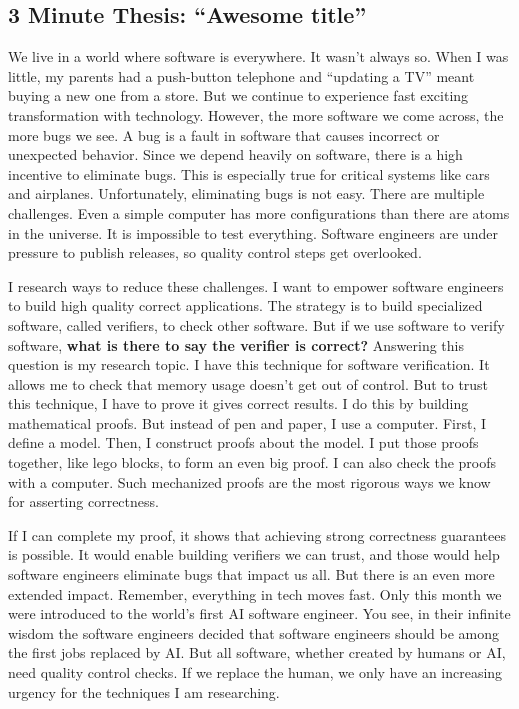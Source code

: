 \subsection{3 Minute Thesis: \enquote{Awesome title}}
\label{subsec:3mt}

We live in a world where software is everywhere.
It wasn’t always so.
When I was little, my parents had a push-button telephone and “updating a TV” meant buying a new one from a store.
But we continue to experience fast exciting transformation with technology.
However, the more software we come across, the more bugs we see.
A bug is a fault in software that causes incorrect or unexpected behavior.
Since we depend heavily on software, there is a high incentive to eliminate bugs.
This is especially true for critical systems like cars and airplanes.
Unfortunately, eliminating bugs is not easy.
There are multiple challenges.
Even a simple computer has more configurations than there are atoms in the universe.
It is impossible to test everything.
Software engineers are under pressure to publish releases, so quality control steps get overlooked.

I research ways to reduce these challenges.
I want to empower software engineers to build high quality correct applications.
The strategy is to build specialized software, called verifiers, to check other software.
But if we use software to verify software, \textbf{what is there to say the verifier is correct?}
Answering this question is my research topic.
I have this technique for software verification.
It allows me to check that memory usage doesn’t get out of control.
But to trust this technique, I have to prove it gives correct results.
I do this by building mathematical proofs.
But instead of pen and paper, I use a computer.
First, I define a model.
Then, I construct proofs about the model.
I put those proofs together, like lego blocks, to form an even big proof.
I can also check the proofs with a computer.
Such mechanized proofs are the most rigorous ways we know for asserting correctness.

If I can complete my proof, it shows that achieving strong correctness guarantees is possible.
It would enable building verifiers we can trust,
and those would help software engineers eliminate bugs that impact us all.
But there is an even more extended impact.
Remember, everything in tech moves fast.
Only this month we were introduced to the world's first AI software engineer.
You see, in their infinite wisdom the software engineers decided that software engineers should be among the first jobs replaced by AI\@.
But all software, whether created by humans or AI, need quality control checks.
If we replace the human, we only have an increasing urgency for the techniques I am researching.
